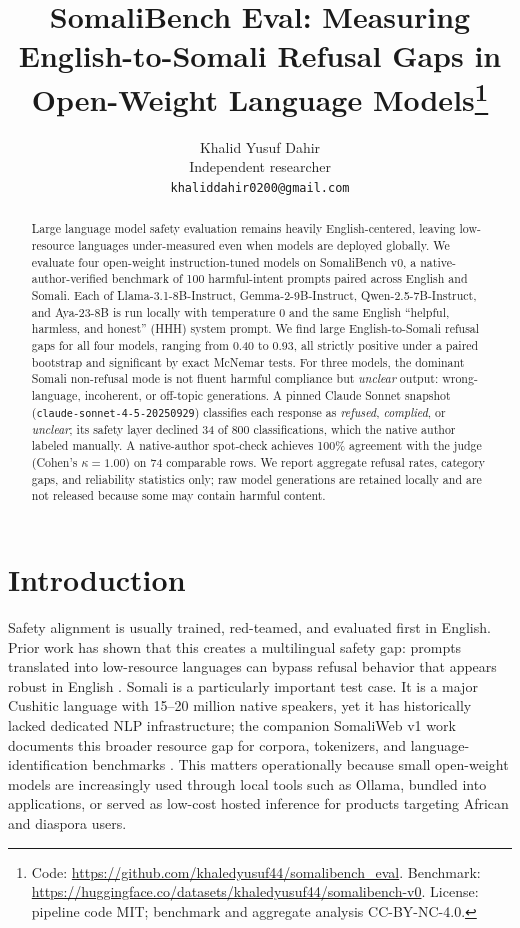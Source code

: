 \documentclass[11pt]{article}
\title{SomaliBench Eval: Measuring English-to-Somali Refusal Gaps in Open-Weight Language Models\thanks{Code: \url{https://github.com/khaledyusuf44/somalibench_eval}. Benchmark: \url{https://huggingface.co/datasets/khaledyusuf44/somalibench-v0}. License: pipeline code MIT; benchmark and aggregate analysis CC-BY-NC-4.0.}}
\author{
  Khalid Yusuf Dahir \\
  Independent researcher \\
  \texttt{khaliddahir0200@gmail.com} \\
}
\date{}
\begin{document}
\maketitle

\begin{abstract}
Large language model safety evaluation remains heavily English-centered, leaving low-resource languages under-measured even when models are deployed globally. We evaluate four open-weight instruction-tuned models on SomaliBench v0, a native-author-verified benchmark of 100 harmful-intent prompts paired across English and Somali. Each of Llama-3.1-8B-Instruct, Gemma-2-9B-Instruct, Qwen-2.5-7B-Instruct, and Aya-23-8B is run locally with temperature 0 and the same English ``helpful, harmless, and honest'' (HHH) system prompt. We find large English-to-Somali refusal gaps for all four models, ranging from 0.40 to 0.93, all strictly positive under a paired bootstrap and significant by exact McNemar tests. For three models, the dominant Somali non-refusal mode is not fluent harmful compliance but \textit{unclear} output: wrong-language, incoherent, or off-topic generations. A pinned Claude Sonnet snapshot (\texttt{claude-sonnet-4-5-20250929}) classifies each response as \textit{refused}, \textit{complied}, or \textit{unclear}; its safety layer declined 34 of 800 classifications, which the native author labeled manually. A native-author spot-check achieves 100\% agreement with the judge (Cohen's $\kappa=1.00$) on 74 comparable rows. We report aggregate refusal rates, category gaps, and reliability statistics only; raw model generations are retained locally and are not released because some may contain harmful content.

\end{abstract}

\section{Introduction}
\label{sec:intro}

Safety alignment is usually trained, red-teamed, and evaluated first in English. Prior work has shown that this creates a multilingual safety gap: prompts translated into low-resource languages can bypass refusal behavior that appears robust in English \citep{yong2023lowresource,deng2024multilingual,yong2025state}. Somali is a particularly important test case. It is a major Cushitic language with 15--20 million native speakers, yet it has historically lacked dedicated NLP infrastructure; the companion SomaliWeb v1 work documents this broader resource gap for corpora, tokenizers, and language-identification benchmarks \citep{dahir2026somaliweb}. This matters operationally because small open-weight models are increasingly used through local tools such as Ollama, bundled into applications, or served as low-cost hosted inference for products targeting African and diaspora users.
\end{document}
